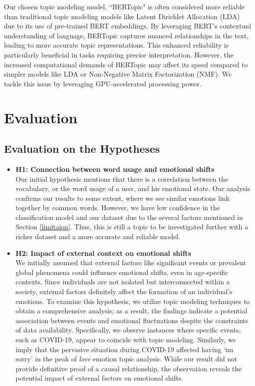 \documentclass[conference,compsoc]{IEEEtran}
\begin{document}
Our chosen topic modeling model, ``BERTopic" is often considered more reliable than traditional topic modeling models like Latent Dirichlet Allocation (LDA) due to its use of pre-trained BERT embeddings. By leveraging BERT's contextual understanding of language, BERTopic captures nuanced relationships in the text, leading to more accurate topic representations. This enhanced reliability is particularly beneficial in tasks requiring precise interpretation. However, the increased computational demands of BERTopic may affect its speed compared to simpler models like LDA or Non-Negative Matrix Factorization (NMF). We tackle this issue by leveraging GPU-accelerated processing power. 

\section{Evaluation}

\subsection{Evaluation on the Hypotheses}

\begin{itemize}
    \item \textbf{H1: Connection between word usage and emotional shifts} \\
    Our initial hypothesis mentions that there is a correlation between the vocabulary, or the word usage of a user, and his emotional state. Our analysis confirms our results to some extent, where we see similar emotions link together by common words. However, we have low confidence in the classification model and our dataset due to the several factors mentioned in Section \ref{limitaion}. Thus, this is still a topic to be investigated further with a richer dataset and a more accurate and reliable model. 

    \item \textbf{H2: Impact of external context on emotional shifts} \\
    We initially assumed that external factors like significant events or prevalent global phenomena could influence emotional shifts, even in age-specific contexts. Since individuals are not isolated but interconnected within a society, external factors definitely affect the formation of an individual's emotions. To examine this hypothesis, we utilize topic modeling techniques to obtain a comprehensive analysis; as a result, the findings indicate a potential association between events and emotional fluctuations despite the constraints of data availability. Specifically, we observe instances where specific events, such as COVID-19, appear to coincide with topic modeling. Similarly, we imply that the pervasive situation during COVID-19 affected having `im sorry' in the peak of \textit{love} emotion topic analysis. While our result did not provide definitive proof of a causal relationship, the observation reveals the potential impact of external factors on emotional shifts. 

\end{itemize}
\end{document}
